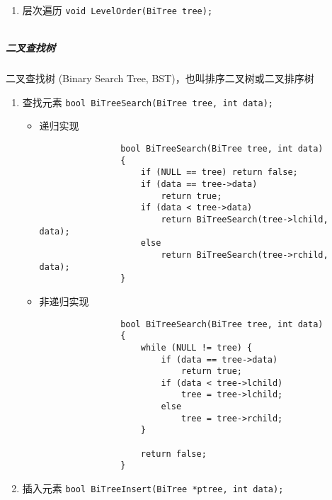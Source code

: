 \documentclass{ctexart}
\begin{document}
\begin{enumerate}
\begin{itemize}
            \item 非递归实现 \footnote{\url{https://en.wikipedia.org/wiki/Tree_traversal\#Post-order_(LRN)}}
                \inputminted{c}{codes/postorder-of-bitree-without-recursion.c}
        \end{itemize}

    \item 层次遍历 \texttt{void LevelOrder(BiTree tree);}
        \inputminted{c}{codes/levelorder-of-bitree.c}

\end{enumerate}

\subparagraph{二叉查找树} 二叉查找树 (Binary Search Tree, BST)，也叫排序二叉树或二叉排序树
\begin{enumerate}
    \item 查找元素 \texttt{bool BiTreeSearch(BiTree tree, int data);}
        \begin{itemize}
            \item 递归实现
                \begin{verbatim}
                bool BiTreeSearch(BiTree tree, int data)
                {
                    if (NULL == tree) return false;
                    if (data == tree->data)
                        return true;
                    if (data < tree->data)
                        return BiTreeSearch(tree->lchild, data);
                    else
                        return BiTreeSearch(tree->rchild, data);
                }
                \end{verbatim}

            \item 非递归实现
                \begin{verbatim}
                bool BiTreeSearch(BiTree tree, int data)
                {
                    while (NULL != tree) {
                        if (data == tree->data)
                            return true;
                        if (data < tree->lchild)
                            tree = tree->lchild;
                        else
                            tree = tree->rchild;
                    }

                    return false;
                }
                \end{verbatim}

        \end{itemize}

    \item 插入元素 \texttt{bool BiTreeInsert(BiTree *ptree, int data);}
        \inputminted{c}{codes/bst-insert.c}


\end{enumerate}
\end{document}
